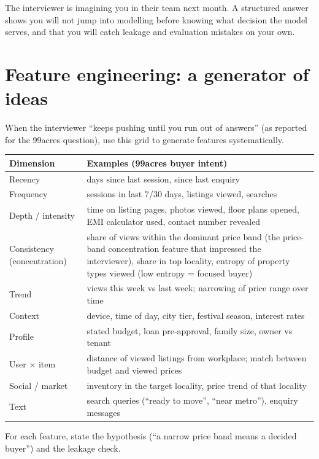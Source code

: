 \begin{intuition}
The interviewer is imagining you in their team next month. A structured answer shows you will not jump into modelling before knowing what decision the model
serves, and that you will catch leakage and evaluation mistakes on your own.
\end{intuition}

\section{Feature engineering: a generator of ideas}
When the interviewer ``keeps pushing until you run out of answers'' (as reported for the 99acres question), use this grid to generate features systematically.
\begin{center}\small
\begin{tabularx}{\linewidth}{l X}
\toprule
Dimension & Examples (99acres buyer intent)\\
\midrule
Recency & days since last session, since last enquiry\\
Frequency & sessions in last 7/30 days, listings viewed, searches\\
Depth / intensity & time on listing pages, photos viewed, floor plans opened, EMI calculator used, contact number revealed\\
Consistency (concentration) & share of views within the dominant price band (the price-band concentration feature that impressed the interviewer), share in top
locality, entropy of property types viewed (low entropy = focused buyer)\\
Trend & views this week vs last week; narrowing of price range over time\\
Context & device, time of day, city tier, festival season, interest rates\\
Profile & stated budget, loan pre-approval, family size, owner vs tenant\\
User $\times$ item & distance of viewed listings from workplace; match between budget and viewed prices\\
Social / market & inventory in the target locality, price trend of that locality\\
Text & search queries (``ready to move'', ``near metro''), enquiry messages\\
\bottomrule
\end{tabularx}
\end{center}
For each feature, state the hypothesis (``a narrow price band means a decided buyer'') and the leakage check.

